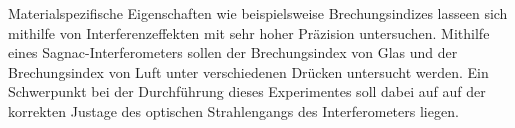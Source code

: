Materialspezifische Eigenschaften wie beispielsweise Brechungsindizes lasseen
sich mithilfe von Interferenzeffekten mit sehr hoher Präzision untersuchen.
Mithilfe eines Sagnac-Interferometers sollen der Brechungsindex von Glas und
der Brechungsindex von Luft unter verschiedenen Drücken untersucht werden.
Ein Schwerpunkt bei der Durchführung dieses Experimentes soll dabei auf auf der
korrekten Justage des optischen Strahlengangs des Interferometers liegen. 
